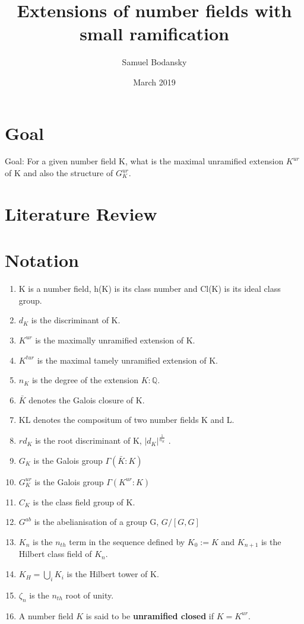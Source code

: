 \documentclass[12pt]{extarticle}
\title{Extensions of number fields with small ramification}
\author{Samuel Bodansky}
\date{March 2019}
\newcommand{\Q}{\mathbb{Q}}
\newcommand{\<}{\langle}
\renewcommand{\>}{\rangle}
\theoremstyle{definition}
\begin{document}
\maketitle
\section{Goal}
Goal: For a given number field K, what is the maximal unramified extension $K^{ur}$ of K and also the structure of $G_K^{ur}$.


\section{Literature Review}

\section{Notation}
\begin{enumerate}
    \item K is a number field, h(K) is its class number and Cl(K) is its ideal class group.
    \item $d_K$ is the discriminant of K.
    \item $K^{ur}$ is the maximally unramified extension of K.
    \item $K^{tur}$ is the maximal tamely unramified extension of K.
    \item $n_K$ is the degree of the extension $K:\Q$.
    \item $\bar{K}$ denotes the Galois closure of K.
    \item KL denotes the compositum of two number fields K and L.
    \item $rd_K$ is the root discriminant of K, $|d_K|^\frac{1}{n_K}$ .
    \item $G_K$ is the Galois group $\Gamma(\bar{K}:K)$
    \item $G_K^{ur}$ is the Galois group $\Gamma(K^{ur}:K)$
    \item $C_K$ is the class field group of K. 
    \item $G^{ab}$ is the abelianisation of a group G, $G/[G,G]$
    \item $K_n$ is the $n_{th}$ term in the sequence defined by $K_0:=K$ and $K_{n+1}$ is the Hilbert class field of $K_n$.
    \item $K_H=\bigcup_{i}K_{i}$ is the Hilbert tower of K.  
    \item $\zeta_n$ is the $n_{th}$ root of unity. 
    \item A number field $K$ is said to be \textbf{unramified closed} if $K = K^{ur}$.
\end{enumerate}
\end{document}
